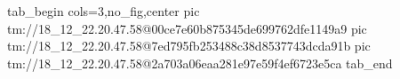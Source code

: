  
 
 
 
 

\qqSecOrig


\ifcmt
  tab_begin cols=3,no_fig,center
    pic tm://18_12_22.20.47.58@00ce7e60b875345de699762dfe1149a9
    pic tm://18_12_22.20.47.58@7ed795fb253488c38d8537743dcda91b
    pic tm://18_12_22.20.47.58@2a703a06eaa281e97e59f4ef6723e5ca
  tab_end
\fi

